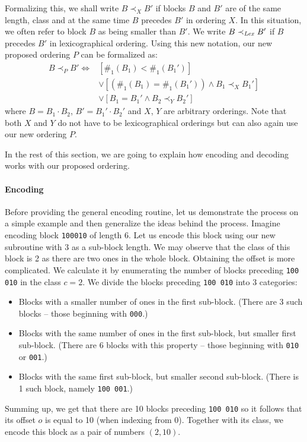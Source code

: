 Formalizing this, we shall write $B\prec_X B'$ if blocks $B$ and $B'$ are of
the same length, class and at the same time $B$ precedes $B'$ in ordering $X$.
In this situation, we often refer to block $B$ as being smaller than $B'$.
We write $B\prec_{\mathit{Lex}} B'$ if $B$ precedes $B'$ in lexicographical ordering.
Using this new notation, our new proposed ordering $P$ can be formalized as:
\begin{align*}
    B\prec_P B' \iff
    &[\#_1(B_1) < \#_1(B_1')] \\
    &\lor [(\#_1(B_1) = \#_1(B_1')) \land B_1 \prec_{X} B_1']\\
    &\lor [B_1 = B_1' \land B_2 \prec_{Y} B_2']
\end{align*}
where $B=B_1\cdot B_2$, $B'=B_1'\cdot B_2'$ and $X$, $Y$ are arbitrary orderings.
Note that both $X$ and $Y$ do not have to be lexicographical orderings but can also again
use our new ordering $P$.

In the rest of this section, we are going to explain how encoding and decoding works
with our proposed ordering.

\paragraph{Encoding}

Before providing the general encoding routine, let us demonstrate the process on
a simple example and then generalize the ideas behind the process. Imagine
encoding block {\tt 100010} of length 6. Let us encode this block using our new
subroutine with 3 as a sub-block length. We may observe that the class of this
block is 2 as there are two ones in the whole block. Obtaining the offset is
more complicated. We calculate it by enumerating the number of blocks preceding
{\tt 100 010} in the class $c=2$. We divide the blocks preceding {\tt 100 010}
into 3 categories:
\begin{itemize}
    \item Blocks with a smaller number of ones in the first sub-block.
    (There are 3 such blocks -- those beginning with {\tt 000}.)
    \item Blocks with the same number of ones in the first sub-block, but smaller first sub-block.
    (There are 6 blocks with this property -- those beginning with {\tt 010} or {\tt 001}.)
    \item Blocks with the same first sub-block, but smaller second sub-block.
    (There is 1 such block, namely {\tt 100 001}.)
\end{itemize}
Summing up, we get that there are 10 blocks preceding {\tt 100 010} so it follows
that its offset $o$ is equal to 10 (when indexing from 0). Together with its class,
we encode this block as a pair of numbers $(2, 10)$.

